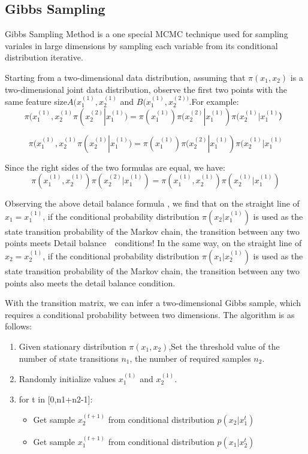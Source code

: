\subsection{Gibbs Sampling}
Gibbs Sampling Method is a one special MCMC technique used for sampling variales in large dimensions by sampling each variable from its conditional distribution iterative.

Starting from a two-dimensional data distribution, assuming that $\pi(x_1,x_2)$ is a two-dimensional joint data distribution, observe the first two points with the same feature size$A(x_1^{(1)},x_2^{(1)}$ and $B(x_1^{(1)},x_2^{(2))}$.For example:
\[
  \pi(x_1^{(1)},x_2^{(1)}\pi(x_2^{(2)}|x_1^{(1)}) = \pi(x_1^{(1)})\pi(x_2^{(2)}|x_1^{(1)})\pi(x_2^{(1)}|x_1^{(1)}）
\]

\[
  \pi(x_1^{(1)},x_2^{(1)}\pi(x_2^{(1)}|x_1^{(1)}) = \pi(x_1^{(1)})\pi(x_2^{(2)}|x_1^{(1)})\pi(x_2^{(1)}|x_1^{(1)}
\]

Since the right sides of the two formulas are equal, we have:
\[
  \pi(x_1^{(1)},x_2^{(1)})\pi(x_2^{(2)}|x_1^{(1)}) =   \pi(x_1^{(1)},x_2^{(1)})\pi(x_2^{(1)}|x_1^{(1)})
\]

Observing the above detail balance formula , we find that on the straight line of $x_1 = x_1^{(1)}$, if the conditional probability distribution $\pi(x_2|x_1^{(1)})$ is used as the state transition probability of the Markov chain, the transition between any two points meets Detail balance　conditions! In the same way, on the straight line of $x_2 = x_2^{(1)}$, if the conditional probability distribution $\pi(x_1|x_2^{(1)})$  is used as the state transition probability of the Markov chain, the transition between any two points also meets the detail balance condition.


With the  transition matrix, we can infer a two-dimensional Gibbs sample, which requires a conditional probability between two dimensions. The algorithm is as follows:
\begin{enumerate}
  \item Given stationary distribution $\pi(x_1,x_2)$,Set the threshold value of the number of state transitions $n_1$, the number of required samples $n_2$.
  \item Randomly initialize values $x_1^{(1)}$ and $x_2^{(1)}$.
  \item for t in [0,n1+n2-1]:
      \begin{itemize}
        \item Get sample $x_2^{(t+1)}$ from conditional distribution $p(x_2|x_1^t)$
        \item Get sample $x_1^{(t+1)}$ from conditional distribution $p(x_1|x_2^t)$
      \end{itemize}
\end{enumerate}
